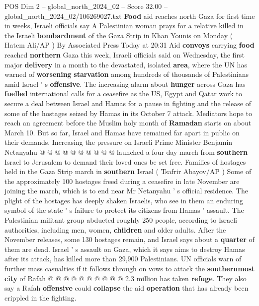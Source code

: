 \begin{textsample}{POS Dim 2 – global\_north\_2024\_02 – Score 32.00 – global\_north\_2024\_02/106269027.txt}  \label{ex:f2_pos_145}
\textbf{Food} aid reaches north Gaza for first time in weeks, Israeli officials say A Palestinian woman prays for a relative killed in the Israeli \textbf{bombardment} of the Gaza Strip in Khan Younis on Monday ( Hatem Ali/AP ) By Associated Press Today at 20:31 Aid \textbf{convoys} carrying \textbf{food} reached \textbf{northern} Gaza this week, Israeli officials said on Wednesday, the first major \textbf{delivery} in a month to the devastated, isolated \textbf{area}, where the UN has warned of \textbf{worsening} \textbf{starvation} among hundreds of thousands of Palestinians amid Israel ' s \textbf{offensive}.
The increasing alarm about \textbf{hunger} across Gaza has \textbf{fuelled} international calls for a ceasefire as the US, Egypt and Qatar work to secure a deal between Israel and Hamas for a pause in fighting and the release of some of the hostages seized by Hamas in its October 7 attack.
Mediators hope to reach an agreement before the Muslim holy month of \textbf{Ramadan} starts on about March 10.
But so far, Israel and Hamas have remained far apart in public on their demands.
Increasing the pressure on Israeli Prime Minister Benjamin Netanyahu @ @ @ @ @ @ @ @ @ @ launched a four-day march from \textbf{southern} Israel to Jerusalem to demand their loved ones be set free.
Families of hostages held in the Gaza Strip march in \textbf{southern} Israel ( Tsafrir Abayov/AP ) Some of the approximately 100 hostages freed during a ceasefire in late November are joining the march, which is to end near Mr Netanyahu ' s official residence.
The plight of the hostages has deeply shaken Israelis, who see in them an enduring symbol of the state ' s failure to protect its citizens from Hamas ' assault.
The Palestinian militant group abducted roughly 250 people, according to Israeli authorities, including men, women, \textbf{children} and older adults.
After the November releases, some 130 hostages remain, and Israel says about a \textbf{quarter} of them are dead.
Israel ' s assault on Gaza, which it says aims to destroy Hamas after its attack, has killed more than 29,900 Palestinians.
UN officials warn of further mass casualties if it follows through on vows to attack the \textbf{southernmost} \textbf{city} of Rafah @ @ @ @ @ @ @ @ @ @ 2.3 million has taken \textbf{refuge}.
They also say a Rafah \textbf{offensive} could \textbf{collapse} the aid \textbf{operation} that has already been crippled in the fighting.

\end{textsample}

